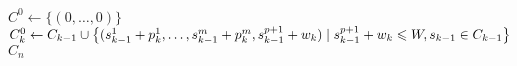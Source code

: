 \begin{algorithmic}[1] %
    \State $C^0 \gets \{(0, \ldots, 0)\}$
      \State $C_k^0 \gets C_{k-1} \cup \big\{(s_{k-1}^1 + p_k^1, \ldots, s_{k-1}^m + p_k^m, s_{k-1}^{p+1} + w_k)
        \; | \; s_{k-1}^{p+1} + w_k \leqslant W, s_{k-1} \in C_{k-1} \big\}$
      \EndFor
    \EndFor
  \State \Return $C_n$
  \EndFunction
\end{algorithmic}
